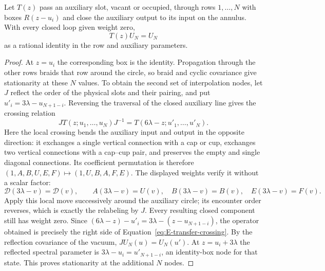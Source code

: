 \begin{lemma}\label{lem:02-algebraic-stationarity}
Let $T(z)$ pass an auxiliary slot, vacant or occupied, through rows
$1,\ldots,N$ with boxes $R(z-u_i)$ and close the auxiliary output to
its input on the annulus. With every closed loop given weight zero,
\[
 T(z)U_N=U_N
\]
as a rational identity in the row and auxiliary parameters.
\end{lemma}
\begin{proof}
At $z=u_i$ the corresponding box is the identity. Propagation through
the other rows braids that row around the circle, so braid and cyclic
covariance give stationarity at these $N$ values. To obtain the second
set of interpolation nodes, let $J$ reflect the order of the physical
slots and their pairing, and put $u'_i=3\lambda-u_{N+1-i}$. Reversing
the traversal of the closed auxiliary line gives the crossing relation
\begin{equation}\label{eq:E-transfer-crossing}
 J T(z;u_1,\ldots,u_N)J^{-1}
       =T(6\lambda-z;u'_1,\ldots,u'_N).
\end{equation}
Here the local crossing bends the auxiliary input and output in the
opposite direction: it exchanges a single vertical connection with
a cap or cup, exchanges two vertical connections with a cap--cup
pair, and preserves the empty and single diagonal connections.
Its coefficient permutation is therefore
$(1,A,B,U,E,F)\mapsto(1,U,B,A,F,E)$. The displayed weights verify it
without a scalar factor:
\[
\mathscr D(3\lambda-v)=\mathscr D(v),\qquad
 A(3\lambda-v)=U(v),\quad B(3\lambda-v)=B(v),\quad
 E(3\lambda-v)=F(v).
\]
Apply this local move successively around the auxiliary circle; its
encounter order reverses, which is exactly the relabeling by $J$.
Every resulting closed component still has weight zero. Since
$(6\lambda-z)-u'_i=3\lambda-(z-u_{N+1-i})$, the operator obtained is
precisely the right side of Equation~\eqref{eq:E-transfer-crossing}.
By the reflection covariance of the vacuum, $J U_N(u)=U_N(u')$.
At $z=u_i+3\lambda$ the reflected spectral parameter is
$3\lambda-u_i=u'_{N+1-i}$, an identity-box node for that state. This
proves stationarity at the additional $N$ nodes.


\end{proof}
